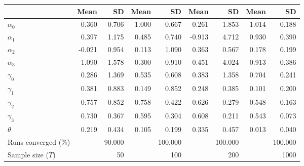 
\begin{tabular}[t]{lrrrrrrrr}
\toprule
  & Mean & SD & Mean  & SD  & Mean   & SD   & Mean    & SD   \\
\midrule
$\alpha_{0}$ & 0.360 & 0.706 & 1.000 & 0.667 & 0.261 & 1.853 & 1.014 & 0.188\\
$\alpha_{1}$ & 0.397 & 1.175 & 0.485 & 0.740 & -0.913 & 4.712 & 0.930 & 0.390\\
$\alpha_{2}$ & -0.021 & 0.954 & 0.113 & 1.090 & 0.363 & 0.567 & 0.178 & 0.199\\
$\alpha_{3}$ & 1.090 & 1.578 & 0.300 & 0.910 & -0.451 & 4.024 & 0.913 & 0.386\\
$\gamma_{0}$ & 0.286 & 1.369 & 0.535 & 0.608 & 0.383 & 1.358 & 0.704 & 0.241\\
$\gamma_{1}$ & 0.381 & 0.883 & 0.149 & 0.852 & 0.248 & 0.385 & 0.101 & 0.200\\
$\gamma_{2}$ & 0.757 & 0.852 & 0.758 & 0.422 & 0.626 & 0.279 & 0.548 & 0.163\\
$\gamma_{3}$ & 0.730 & 0.367 & 0.595 & 0.304 & 0.608 & 0.211 & 0.543 & 0.073\\
$\theta$ & 0.219 & 0.434 & 0.105 & 0.199 & 0.335 & 0.457 & 0.013 & 0.040\\
Runs converged (\%) &  & 90.000 &  & 100.000 &  & 100.000 &  & 100.000\\
Sample size ($T$) &  & 50 &  & 100 &  & 200 &  & 1000\\
\bottomrule
\end{tabular}
